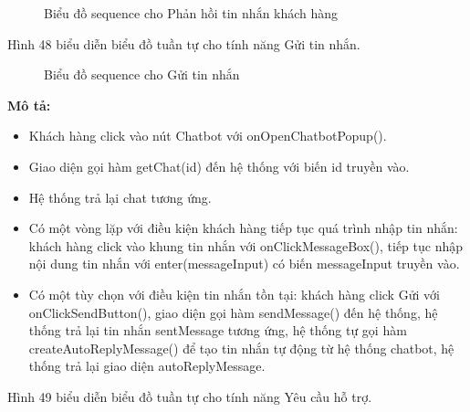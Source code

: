 \begin{figure}[H]
    \centering
     
    \vspace{0.5cm}
    \caption{Biểu đồ sequence cho Phản hồi tin nhắn khách hàng}
    \label{fig:enter-label}
\end{figure}

Hình 48 biểu diễn biểu đồ tuần tự cho tính năng Gửi tin nhắn.

\begin{figure}[H]
    \centering
     
    \vspace{0.5cm}
    \caption{Biểu đồ sequence cho Gửi tin nhắn}
    \label{fig:enter-label}
\end{figure}


\textbf{Mô tả: }
\begin{itemize}
	\item Khách hàng click vào nút Chatbot với onOpenChatbotPopup().
	\item Giao diện gọi hàm getChat(id) đến hệ thống với biến id truyền vào.
	\item Hệ thống trả lại chat tương ứng.
	\item Có một vòng lặp với điều kiện khách hàng tiếp tục quá trình nhập tin nhắn: khách hàng click vào khung tin nhắn với onClickMessageBox(), tiếp tục nhập nội dung tin nhắn với enter(messageInput) có biến messageInput truyền vào.
	\item Có một tùy chọn với điều kiện tin nhắn tồn tại: khách hàng click Gửi với onClickSendButton(), giao diện gọi hàm sendMessage() đến hệ thống, hệ thống trả lại tin nhắn sentMessage tương ứng, hệ thống tự gọi hàm createAutoReplyMessage() để tạo tin nhắn tự động từ hệ thống chatbot, hệ thống trả lại giao diện autoReplyMessage.
\end{itemize}



Hình 49 biểu diễn biểu đồ tuần tự cho tính năng Yêu cầu hỗ trợ.

